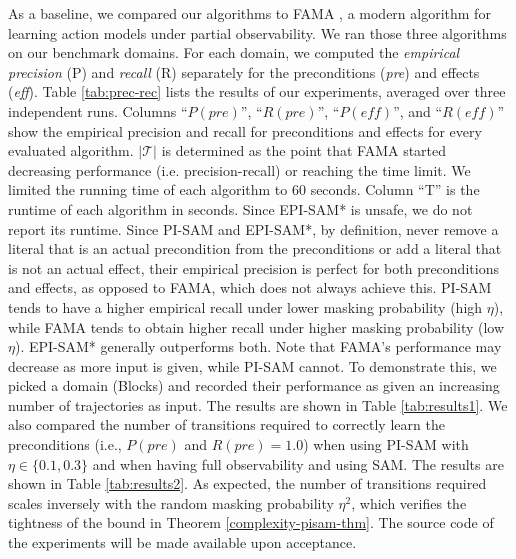 \documentclass[letterpaper]{article} %
\newcommand{\pre}{\textit{pre}}
\newcommand{\eff}{\textit{eff}}
\begin{document}
As a baseline, we compared our algorithms to FAMA \citep{aineto2019learning}, a modern algorithm for learning action models under partial observability. We ran those three algorithms on our benchmark domains. %
For each domain, we computed the \textit{empirical precision} (P) and \textit{recall} (R) separately for the preconditions (\pre) and effects (\eff).
Table \ref{tab:prec-rec} lists the results of our experiments, averaged over three independent runs.
Columns ``$P(\pre)$'', ``$R(\pre)$'', ``$P(\eff)$'', and ``$R(\eff)$'' show the empirical precision and recall for preconditions and effects for every evaluated algorithm.
$|\mathcal{T}|$ is determined as the point that FAMA started decreasing performance (i.e. precision-recall) or reaching the time limit. We limited the running time of each algorithm to 60 seconds. Column ``T'' is the runtime of each algorithm in seconds. %
Since EPI-SAM* is unsafe, we do not report its runtime. %
Since PI-SAM and EPI-SAM*, by definition, never remove a literal that is an actual precondition from the preconditions or add a literal that is not an actual effect, their empirical precision is perfect for both preconditions and effects, as opposed to FAMA, which does not always achieve this.
PI-SAM tends to have a higher empirical recall under lower masking probability (high $\eta$), while FAMA tends to obtain higher recall under higher masking probability (low $\eta$). EPI-SAM* generally outperforms both.
Note that FAMA's performance may decrease as more input is given, while PI-SAM cannot.
To demonstrate this, we picked a domain (Blocks) and recorded their performance as given an increasing number of trajectories as input. The results are shown in Table \ref{tab:results1}.
We also compared the number of transitions required to correctly learn the preconditions (i.e., $P(\pre)$ and $R(\pre) = 1.0$)
when using PI-SAM with $\eta\in\{0.1, 0.3\}$ and when having full observability and using SAM.
The results are shown in Table \ref{tab:results2}. As expected, the number of transitions required scales inversely with the random masking probability $\eta^2$, which verifies the tightness of the bound in Theorem \ref{complexity-pisam-thm}.
The source code of the experiments will be made available upon acceptance.
\end{document}
